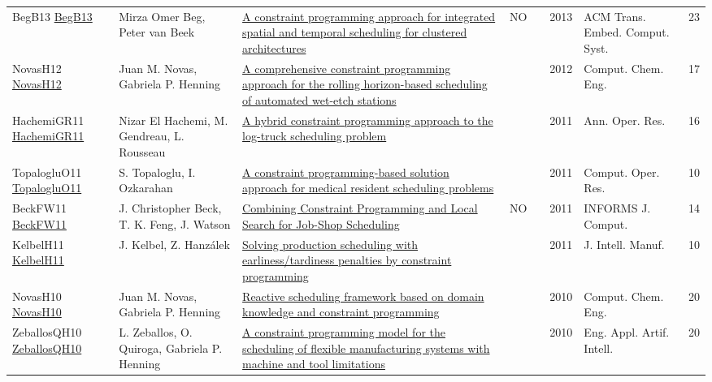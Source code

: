 {\begin{longtable}{p{3cm}p{6cm}p{7cm}rrrp{3cm}r}
BegB13 \href{http://doi.acm.org/10.1145/2512470}{BegB13} & Mirza Omer Beg, Peter van Beek & \href{articles/BegB13.pdf}{A constraint programming approach for integrated spatial and temporal scheduling for clustered architectures} & NO & \cite{BegB13} & 2013 & {ACM} Trans. Embed. Comput. Syst. & 23\\
NovasH12 \href{https://doi.org/10.1016/j.compchemeng.2012.01.005}{NovasH12} & Juan M. Novas, Gabriela P. Henning & \href{articles/NovasH12.pdf}{A comprehensive constraint programming approach for the rolling horizon-based scheduling of automated wet-etch stations} &  & \cite{NovasH12} & 2012 & Comput. Chem. Eng. & 17\\
HachemiGR11 \href{https://doi.org/10.1007/s10479-010-0698-x}{HachemiGR11} & Nizar El Hachemi, M. Gendreau, L. Rousseau & \href{articles/HachemiGR11.pdf}{A hybrid constraint programming approach to the log-truck scheduling problem} &  & \cite{HachemiGR11} & 2011 & Ann. Oper. Res. & 16\\
TopalogluO11 \href{https://doi.org/10.1016/j.cor.2010.04.018}{TopalogluO11} & S. Topaloglu, I. Ozkarahan & \href{articles/TopalogluO11.pdf}{A constraint programming-based solution approach for medical resident scheduling problems} &  & \cite{TopalogluO11} & 2011 & Comput. Oper. Res. & 10\\
BeckFW11 \href{https://doi.org/10.1287/ijoc.1100.0388}{BeckFW11} & J. Christopher Beck, T. K. Feng, J. Watson & \href{articles/BeckFW11.pdf}{Combining Constraint Programming and Local Search for Job-Shop Scheduling} & NO & \cite{BeckFW11} & 2011 & {INFORMS} J. Comput. & 14\\
KelbelH11 \href{https://doi.org/10.1007/s10845-009-0318-2}{KelbelH11} & J. Kelbel, Z. Hanz{\'{a}}lek & \href{articles/KelbelH11.pdf}{Solving production scheduling with earliness/tardiness penalties by constraint programming} &  & \cite{KelbelH11} & 2011 & J. Intell. Manuf. & 10\\
NovasH10 \href{https://doi.org/10.1016/j.compchemeng.2010.07.011}{NovasH10} & Juan M. Novas, Gabriela P. Henning & \href{articles/NovasH10.pdf}{Reactive scheduling framework based on domain knowledge and constraint programming} &  & \cite{NovasH10} & 2010 & Comput. Chem. Eng. & 20\\
ZeballosQH10 \href{https://doi.org/10.1016/j.engappai.2009.07.002}{ZeballosQH10} & L. Zeballos, O. Quiroga, Gabriela P. Henning & \href{articles/ZeballosQH10.pdf}{A constraint programming model for the scheduling of flexible manufacturing systems with machine and tool limitations} &  & \cite{ZeballosQH10} & 2010 & Eng. Appl. Artif. Intell. & 20\\

\end{longtable}}
